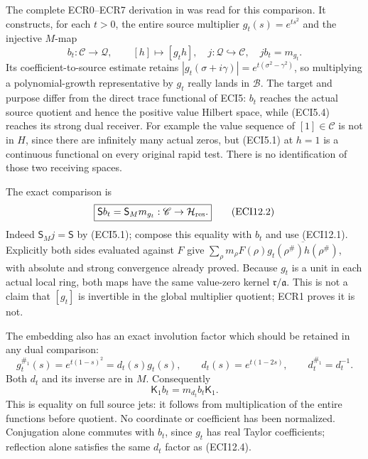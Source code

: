 The complete ECR0--ECR7 derivation in
\href{https://github.com/KokunoYumeto/zeta-function-research-reader/blob/main/workbenches/splitzero-tandem/continuations/20260925-full-source-tensor-and-original-divisor/gct/EXTENSION_CLASS_TO_ORIGINAL_RESIDUE.md}{}
was read for this comparison. It constructs, for each \(t>0\), the
entire source multiplier \(g_t(s)=e^{ts^2}\) and the injective \(M\)-map
\[
b_t:\mathscr C\to\mathcal Q,\qquad[h]\mapsto[g_t h],
\quad j:\mathcal Q\hookrightarrow\mathscr C,
\quad jb_t=m_{g_t}.
\tag{ECI12.1}
\] Its coefficient-to-source estimate retains
\(|g_t(\sigma+i\gamma)|=e^{t(\sigma^2-\gamma^2)}\), so multiplying a
polynomial-growth representative by \(g_t\) really lands in
\(\mathcal B\). The target and purpose differ from the direct trace
functional of ECI5: \(b_t\) reaches the actual source quotient and hence
the positive value Hilbert space, while (ECI5.4) reaches its strong dual
receiver. For example the value sequence of \([1]\in\mathscr C\) is not
in \(H\), since there are infinitely many actual zeros, but (ECI5.1) at
\(h=1\) is a continuous functional on every original rapid test. There
is no identification of those two receiving spaces.

The exact comparison is \[
\boxed{\mathsf S b_t=\mathsf S_M m_{g_t}:\mathscr C\to\mathcal H_{\rm res}.}
\tag{ECI12.2}
\] Indeed \(\mathsf S_Mj=\mathsf S\) by (ECI5.1); compose this equality
with \(b_t\) and use (ECI12.1). Explicitly both sides evaluated against
\(F\) give
\(\sum_\rho m_\rho F(\rho)\overline{g_t(\rho^\#)h(\rho^\#)}\), with
absolute and strong convergence already proved. Because \(g_t\) is a
unit in each actual local ring, both maps have the same value-zero
kernel \(\mathfrak r/\mathfrak a\). This is not a claim that \([g_t]\)
is invertible in the global multiplier quotient; ECR1 proves it is not.

The embedding also has an exact involution factor which should be
retained in any dual comparison: \[
g_t^{\#_1}(s)=e^{t(1-s)^2}=d_t(s)g_t(s),
\qquad d_t(s)=e^{t(1-2s)},
\qquad d_t^{\#_1}=d_t^{-1}.
\tag{ECI12.3}
\] Both \(d_t\) and its inverse are in \(M\). Consequently \[
\mathsf K_1 b_t=m_{d_t}b_t\mathsf K_1.
\tag{ECI12.4}
\] This is equality on full source jets: it follows from multiplication
of the entire functions before quotient. No coordinate or coefficient
has been normalized. Conjugation alone commutes with \(b_t\), since
\(g_t\) has real Taylor coefficients; reflection alone satisfies the
same \(d_t\) factor as (ECI12.4).

